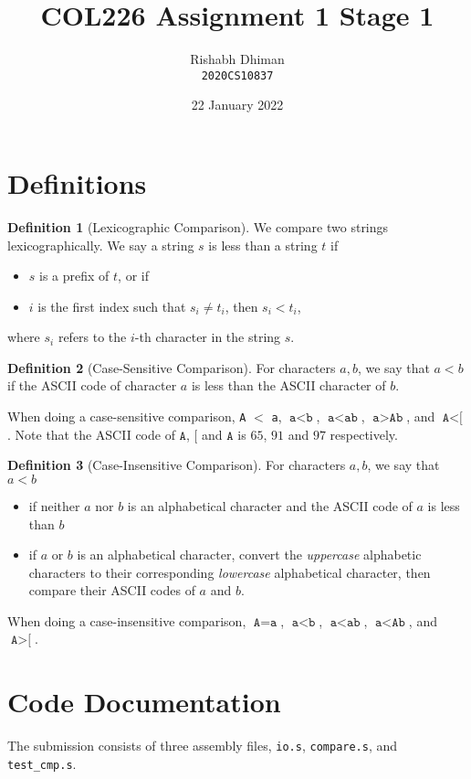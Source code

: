 \documentclass[a4paper]{scrartcl}
\title{COL226 Assignment 1 Stage 1}
\date{22 January 2022}
\author{Rishabh Dhiman\\ \texttt{2020CS10837}}
\theoremstyle{definition}
\newtheorem{definition}{Definition}
\renewcommand{\tt}{\texttt}
\begin{document}
\maketitle

\section{Definitions}

\begin{definition}[Lexicographic Comparison]
We compare two strings lexicographically. We say a string $s$ is less than a string $t$ if
\begin{itemize}
	\item $s$ is a prefix of $t$, or if
	\item $i$ is the first index such that $s_i \neq t_i$, then $s_i < t_i$,
\end{itemize}
where $s_i$ refers to the $i$-th character in the string $s$.
\end{definition}

\begin{definition}[Case-Sensitive Comparison]
	For characters $a, b$, we say that $a < b$ if the ASCII code of character $a$ is less than the ASCII character of $b$.
\end{definition}

When doing a case-sensitive comparison, \tt{A} $<$ \tt{a}, $\tt{a} < \tt{b}$, $\tt{a} < \tt{ab}$, $\tt{a} > \tt{Ab}$, and $\tt{A} < \tt{[}$. Note that the ASCII code of $\tt{A}$, $\tt{[}$ and $\tt{A}$ is $65$, $91$ and $97$ respectively.

\begin{definition}[Case-Insensitive Comparison]
	For characters $a, b$, we say that $a < b$
	\begin{itemize}
		\item if neither $a$ nor $b$ is an alphabetical character and the ASCII code of $a$ is less than $b$
		\item if $a$ or $b$ is an alphabetical character, convert the \emph{uppercase} alphabetic characters to their corresponding \emph{lowercase} alphabetical character, then compare their ASCII codes of $a$ and $b$.
	\end{itemize}
\end{definition}

When doing a case-insensitive comparison, $\tt{A} = \tt{a}$, $\tt{a} < \tt{b}$, $\tt{a} < \tt{ab}$, $\tt{a} < \tt{Ab}$, and $\tt{A} > \tt{[}$.


\section{Code Documentation}
The submission consists of three assembly files, \tt{io.s}, \tt{compare.s}, and \tt{test_cmp.s}.
\end{document}
